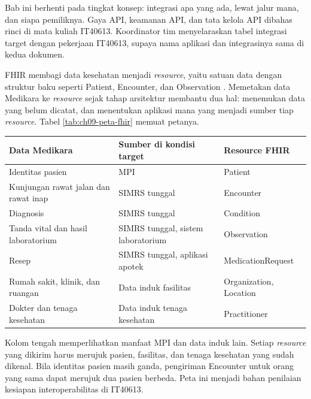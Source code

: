 Bab ini berhenti pada tingkat konsep: integrasi apa yang ada, lewat jalur
mana, dan siapa pemiliknya. Gaya API, keamanan API, dan tata kelola API
dibahas rinci di mata kuliah IT40613. Koordinator tim menyelaraskan tabel
integrasi target dengan pekerjaan IT40613, supaya nama aplikasi dan
integrasinya sama di kedua dokumen.

\begin{pendalaman}[title={Pendalaman Teknis (opsional): Memetakan Sumber Data Medikara ke Resource FHIR}]
FHIR membagi data kesehatan menjadi \textit{resource}, yaitu satuan data
dengan struktur baku seperti Patient, Encounter, dan Observation
\cite{c09-fhir-r4}. Memetakan data Medikara ke \textit{resource} sejak tahap
arsitektur membantu dua hal: menemukan data yang belum dicatat, dan
menentukan aplikasi mana yang menjadi sumber tiap \textit{resource}. Tabel
\ref{tab:ch09-peta-fhir} memuat petanya.

\begin{center}
  \label{tab:ch09-peta-fhir}
  \small
  \begin{tabularx}{\linewidth}{lXl}
    \hline
    \textbf{Data Medikara} & \textbf{Sumber di kondisi target} & \textbf{Resource FHIR} \\
    \hline
    Identitas pasien & MPI & Patient \\
    \hline
    Kunjungan rawat jalan dan rawat inap & SIMRS tunggal & Encounter \\
    \hline
    Diagnosis & SIMRS tunggal & Condition \\
    \hline
    Tanda vital dan hasil laboratorium & SIMRS tunggal, sistem laboratorium & Observation \\
    \hline
    Resep & SIMRS tunggal, aplikasi apotek & MedicationRequest \\
    \hline
    Rumah sakit, klinik, dan ruangan & Data induk fasilitas & Organization, Location \\
    \hline
    Dokter dan tenaga kesehatan & Data induk tenaga kesehatan & Practitioner \\
    \hline
  \end{tabularx}
\end{center}

Kolom tengah memperlihatkan manfaat MPI dan data induk lain. Setiap
\textit{resource} yang dikirim harus merujuk pasien, fasilitas, dan tenaga
kesehatan yang sudah dikenal. Bila identitas pasien masih ganda, pengiriman
Encounter untuk orang yang sama dapat merujuk dua pasien berbeda. Peta ini
menjadi bahan penilaian kesiapan interoperabilitas di IT40613.
\end{pendalaman}

